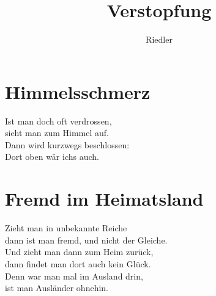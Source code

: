 \documentclass[11pt]{article}
\title{\textbf{Verstopfung}}
\author{Riedler}
\date{}
\begin{document}
\maketitle
\thispagestyle{empty}

\section*{Himmelsschmerz}

Ist man doch oft verdrossen,\\
sieht man zum Himmel auf.\\
Dann wird kurzwegs beschlossen:\\
Dort oben wär ichs auch.

\section*{Fremd im Heimatsland}

Zieht man in unbekannte Reiche\\
dann ist man fremd, und nicht der Gleiche.\\
Und zieht man dann zum Heim zurück,\\
dann findet man dort auch kein Glück.\\
Denn war man mal im Ausland drin,\\
ist man Ausländer ohnehin.
\end{document}
